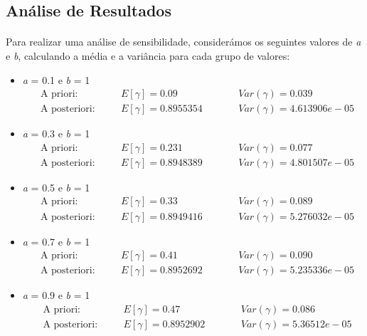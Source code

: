 \documentclass{article}
\begin{document}
\newpage

				\subsection*{Análise de Resultados}
				\paragraph{}
				Para realizar uma análise de sensibilidade, considerámos os seguintes valores de \textit{a} e \textit{b}, calculando a média e a variância para cada grupo de valores:  			
					\begin{itemize}
					\item \textit{a} = 0.1 e \textit{b} = 1
						\begin{align*}
							&\text{A priori}: \quad &&E[\gamma] = 0.09  \quad  &&Var(\gamma) = 0.039\\
						 	&\text{A posteriori}: \quad &&E[\gamma] = 0.8955354  \quad \quad &&Var(\gamma) = 4.613906e-05
						\end{align*}

					\item \textit{a} = 0.3 e \textit{b} = 1  
						\begin{align*}
							&\text{A priori}: \quad &&E[\gamma] = 0.231  \quad  &&Var(\gamma) = 0.077\\
						 	&\text{A posteriori}: \quad &&E[\gamma] =  0.8948389  \quad \quad &&Var(\gamma) = 4.801507e-05
						\end{align*}							
						
					\item \textit{a} = 0.5 e \textit{b} = 1 
						\begin{align*}
							&\text{A priori}: \quad &&E[\gamma] = 0.33  \quad  &&Var(\gamma) = 0.089\\
						 	&\text{A posteriori}: \quad &&E[\gamma] =  0.8949416  \quad \quad &&Var(\gamma) =5.276032e-05
						\end{align*}					
					
					\item \textit{a} = 0.7 e \textit{b} = 1 
						\begin{align*}
							&\text{A priori}: \quad &&E[\gamma] = 0.41  \quad  &&Var(\gamma) = 0.090\\
						 	&\text{A posteriori}: \quad &&E[\gamma] =  0.8952692 \quad \quad &&Var(\gamma) = 5.235336e-05
						\end{align*}			
				
					\item \textit{a} = 0.9 e \textit{b} = 1  
						\begin{align*}
							&\text{A priori}: \quad &&E[\gamma] = 0.47  \quad  &&Var(\gamma) = 0.086\\
						 	&\text{A posteriori}: \quad &&E[\gamma] = 0.8952902  \quad \quad &&Var(\gamma) =5.36512e-05
						\end{align*}					
					

\end{itemize}
\end{document}
